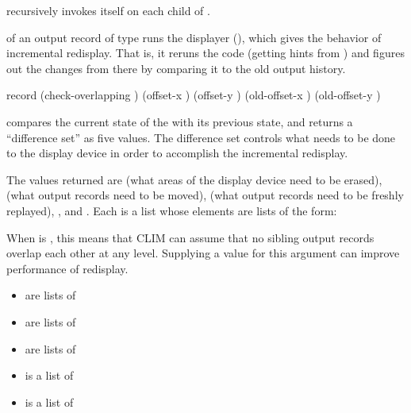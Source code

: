  recursively invokes itself on each child of
.

 of an output record of type
 runs the displayer (),
which gives the behavior of incremental redisplay.  That is, it reruns the code
(getting hints from ) and figures out the changes from there
by comparing it to the old output history.


 {record \optional (check-overlapping )
                                      (offset-x ) (offset-y )
                                      (old-offset-x ) (old-offset-y )} 

 compares the current state of the   with its previous state, and returns a ``difference set''
as five values.  The difference set controls what needs to be done to the
display device in order to accomplish the incremental redisplay.

The values returned are  (what areas of the display device need to
be erased),  (what output records need to be moved), 
(what output records need to be freshly replayed), , and
.  Each is a list whose elements are lists of the form:

When  is , this means that CLIM can assume
that no sibling output records overlap each other at any level.  Supplying a
 value for this argument can improve performance of redisplay.


\begin{itemize}
\item {} are lists of 

\item {} are lists of 

\item {} are lists of 

\item {} is a list of 

\item {} is a list of 
\end{itemize}


